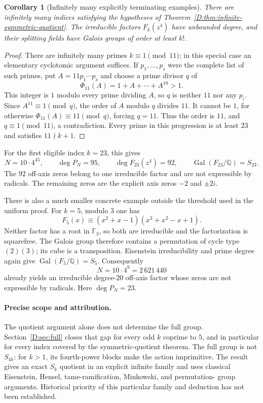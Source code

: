 \documentclass[11pt,a4paper]{article}
\newtheorem{corollary}[theorem]{Corollary}
\theoremstyle{definition}
\theoremstyle{remark}
\numberwithin{equation}{section}
\begin{document}
\begin{corollary}[Infinitely many explicitly terminating examples]
There are infinitely many indices satisfying the hypotheses of
Theorem~\ref{D:thm:infinite-symmetric-quotient}. The irreducible factors
$F_k(z^4)$ have unbounded degree, and their splitting fields have
Galois groups of order at least $k!$.
\end{corollary}
\begin{proof}
There are infinitely many primes $k\equiv1\pmod {11}$; in this special
case an elementary cyclotomic argument suffices. If $p_1,\ldots,p_s$
were the complete list of such primes, put $A=11p_1\cdots p_s$ and
choose a prime divisor $q$ of
\[
 \Phi_{11}(A)=1+A+\cdots+A^{10}>1.
\]
This integer is $1$ modulo every prime dividing $A$, so $q$ is neither
$11$ nor any $p_i$. Since $A^{11}\equiv1\pmod q$, the order of $A$
modulo $q$ divides $11$. It cannot be $1$, for otherwise
$\Phi_{11}(A)\equiv11\pmod q$, forcing $q=11$. Thus the order is
$11$, and $q\equiv1\pmod {11}$, a contradiction. Every prime in this
progression is at least $23$ and satisfies $11\nmid k+1$.
\end{proof}

For the first eligible index $k=23$, this gives
\[
 N=10\cdot4^{45},\qquad
 \deg P_N=95,\qquad \deg F_{23}(z^4)=92,
 \qquad \operatorname{Gal}(F_{23}/\mathbb Q)=S_{23}.
\]
The $92$ off-axis zeros belong to one irreducible factor and are not
expressible by radicals. The remaining zeros are the explicit axis
zeros $-2$ and $\pm2i$.

There is also a much smaller concrete example outside the threshold
used in the uniform proof. For $k=5$, modulo $3$ one has
\[
 F_5(x)\equiv(x^2+x-1)(x^3+x^2-x+1).
\]
Neither factor has a root in $\mathbb F_3$, so both are irreducible
and the factorization is squarefree. The Galois group therefore
contains a permutation of cycle type $(2)(3)$; its cube is a
transposition. Eisenstein irreducibility and prime degree again give
$\operatorname{Gal}(F_5/\mathbb Q)=S_5$. Consequently
\[
 N=10\cdot4^9=2\,621\,440
\]
already yields an irreducible degree-$20$ off-axis factor whose zeros
are not expressible by radicals. Here $\deg P_N=23$.

\paragraph{Precise scope and attribution.}
The quotient argument alone does not determine the full group.
Section~\ref{D:sec:full} closes that gap for every odd $k$ coprime to $5$,
and in particular for every index covered by the symmetric-quotient theorem.
The full group is not $S_{4k}$: for $k>1$, its fourth-power blocks make the
action imprimitive. The result gives
an exact $S_k$ quotient in an explicit infinite family and uses
classical Eisenstein, Hensel, tame-ramification, Minkowski, and permutation-
group arguments. Historical priority of this particular family and
deduction has not been established.
\end{document}
